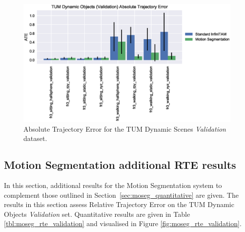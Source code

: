 \begin{figure}[h]
  \label{fig:moseg_ate_validation}
  \centering
  \includegraphics[width=\linewidth]{figures/moseg/ate_validation.eps}
  \caption[Motion Segmentation ATE Validation Set]
  {Absolute Trajectory Error for the TUM Dynamic Scenes
    \textit{Validation} dataset.}
\end{figure}

\subsection{Motion Segmentation additional RTE results}
In this section, additional results for the Motion Segmentation system
to complement those outlined in Section~\ref{sec:moseg_quantitative} are given.
The results in this section assess Relative Trajectory Error on the TUM Dynamic
Objects \textit{Validation} set. Quantitative results are given in Table
\ref{tbl:moseg_rte_validation} and visualised in Figure
\ref{fig:moseg_rte_validation}.

